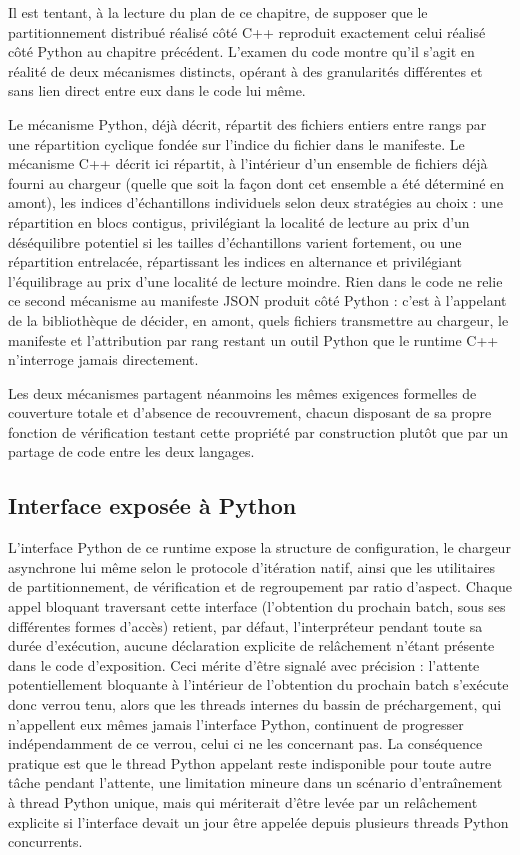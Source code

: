 \documentclass[12pt,a4paper]{report}
\begin{document}
Il est tentant, à la lecture du plan de ce chapitre, de supposer que le partitionnement distribué réalisé côté C++ reproduit exactement celui réalisé côté Python au chapitre précédent. L'examen du code montre qu'il s'agit en réalité de deux mécanismes distincts, opérant à des granularités différentes et sans lien direct entre eux dans le code lui même.

Le mécanisme Python, déjà décrit, répartit des fichiers entiers entre rangs par une répartition cyclique fondée sur l'indice du fichier dans le manifeste. Le mécanisme C++ décrit ici répartit, à l'intérieur d'un ensemble de fichiers déjà fourni au chargeur (quelle que soit la façon dont cet ensemble a été déterminé en amont), les indices d'échantillons individuels selon deux stratégies au choix : une répartition en blocs contigus, privilégiant la localité de lecture au prix d'un déséquilibre potentiel si les tailles d'échantillons varient fortement, ou une répartition entrelacée, répartissant les indices en alternance et privilégiant l'équilibrage au prix d'une localité de lecture moindre. Rien dans le code ne relie ce second mécanisme au manifeste JSON produit côté Python : c'est à l'appelant de la bibliothèque de décider, en amont, quels fichiers transmettre au chargeur, le manifeste et l'attribution par rang restant un outil Python que le runtime C++ n'interroge jamais directement.

Les deux mécanismes partagent néanmoins les mêmes exigences formelles de couverture totale et d'absence de recouvrement, chacun disposant de sa propre fonction de vérification testant cette propriété par construction plutôt que par un partage de code entre les deux langages.

\subsection{Interface exposée à Python}

L'interface Python de ce runtime expose la structure de configuration, le chargeur asynchrone lui même selon le protocole d'itération natif, ainsi que les utilitaires de partitionnement, de vérification et de regroupement par ratio d'aspect. Chaque appel bloquant traversant cette interface (l'obtention du prochain batch, sous ses différentes formes d'accès) retient, par défaut, l'interpréteur pendant toute sa durée d'exécution, aucune déclaration explicite de relâchement n'étant présente dans le code d'exposition. Ceci mérite d'être signalé avec précision : l'attente potentiellement bloquante à l'intérieur de l'obtention du prochain batch s'exécute donc verrou tenu, alors que les threads internes du bassin de préchargement, qui n'appellent eux mêmes jamais l'interface Python, continuent de progresser indépendamment de ce verrou, celui ci ne les concernant pas. La conséquence pratique est que le thread Python appelant reste indisponible pour toute autre tâche pendant l'attente, une limitation mineure dans un scénario d'entraînement à thread Python unique, mais qui mériterait d'être levée par un relâchement explicite si l'interface devait un jour être appelée depuis plusieurs threads Python concurrents.
\end{document}
